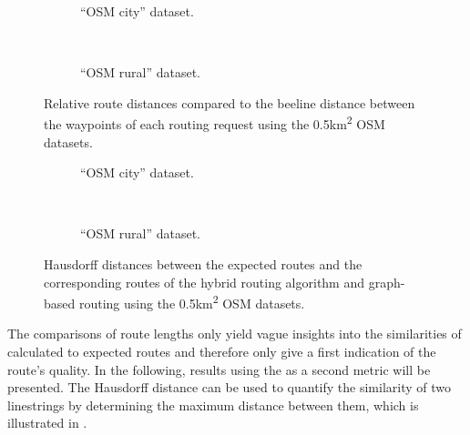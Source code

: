 			\begin{figure}[h]
				\begin{subfigure}[t]{\linewidth}
					\begin{figcenter}
						
					\end{figcenter}
					\caption{\enquote{OSM city} dataset.}
					\label{fig:eval-route-distances-city}
				\end{subfigure}
				\\[3ex]
				\begin{subfigure}[t]{\linewidth}
					\begin{figcenter}
						
					\end{figcenter}
					\caption{\enquote{OSM rural} dataset.}
					\label{fig:eval-route-distances-rural}
				\end{subfigure}
				\caption{Relative route distances compared to the beeline distance between the waypoints of each routing request using the 0.5km\textsuperscript{2} OSM datasets.}
				\label{fig:eval-route-distances}
			\end{figure}
			
			\begin{figure}[h]
				\begin{subfigure}[t]{\linewidth}
					\begin{figcenter}
						
					\end{figcenter}
					\caption{\enquote{OSM city} dataset.}
					\label{fig:eval-hausdorff-city}
				\end{subfigure}
				\\[3ex]
				\begin{subfigure}[t]{\linewidth}
					\begin{figcenter}
						
					\end{figcenter}
					\caption{\enquote{OSM rural} dataset.}
					\label{fig:eval-hausdorff-rural}
				\end{subfigure}
				\caption{Hausdorff distances between the expected routes and the corresponding routes of the hybrid routing algorithm and graph-based routing using the 0.5km\textsuperscript{2} OSM datasets.}
				\label{fig:eval-hausdorff}
			\end{figure}
			
			The comparisons of route lengths only yield vague insights into the similarities of calculated to expected routes and therefore only give a first indication of the route's quality.
			In the following, results using the  as a second metric will be presented.
			The Hausdorff distance can be used to quantify the similarity of two linestrings by determining the maximum distance between them, which is illustrated in .
			
